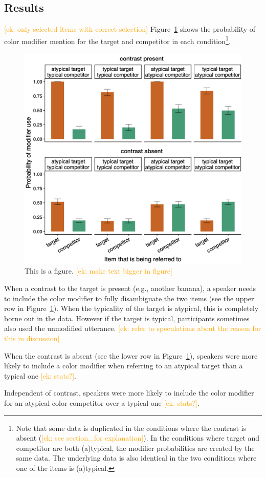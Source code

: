 \documentclass[10pt,letterpaper]{article}
\newcommand{\ek}[1]{\textcolor{Orange}{[ek: #1]}}
\begin{document}
\subsection{Results}
\ek{only selected items with correct selection}
Figure~\ref{prod-results} shows the probability of color modifier mention for the target and competitor in each condition\footnote{Note that some data is duplicated in the conditions where the contrast is absent (\ek{see section...for explanation}). In the conditions where target and competitor are both (a)typical, the modifier probabilities are created by the same data. The underlying data is also identical in the two conditions where one of the items is (a)typical.}. 

\begin{figure}[H]
	\begin{center}
		\includegraphics[width=.45\textwidth]{graphs/prod-bycond-paper.pdf}
	\end{center}
\caption{This is a figure. \ek{make text bigger in figure}} 
\label{prod-results}
\end{figure}

When a contrast to the target is present (e.g., another banana), a speaker needs to include the color modifier to fully disambiguate the two items (see the upper row in Figure~\ref{prod-results}). When the typicality of the target is atypical, this is completely borne out in the data. However if the target is typical, participants sometimes also used the unmodified utterance. \ek{refer to speculations about the reason for this in discussion} 

When the contrast is absent (see the lower row in Figure~\ref{prod-results}), speakers were more likely to include a color modifier when referring to an atypical target than a typical one \ek{stats?}.

Independent of contrast, speakers were more likely to include the color modifier for an atypical color competitor over a typical one \ek{stats?}.
\end{document}
